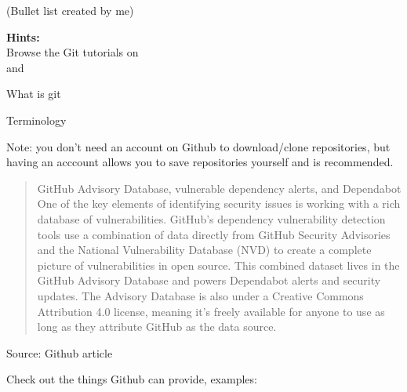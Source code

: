 \documentclass[Screen16to9,17pt]{foils}
\begin{document}
(Bullet list created by me)


{\bf Hints:}\\
Browse the Git tutorials on \\
and 

\begin{list2}
\item What is git
\item Terminology
\end{list2}

Note: you don't need an account on Github to download/clone repositories, but having an acccount allows you to save repositories yourself and is recommended.



\begin{quote}\small
GitHub Advisory Database, vulnerable dependency alerts, and Dependabot
One of the key elements of identifying security issues is working with a rich database of vulnerabilities. GitHub’s dependency vulnerability detection tools use a combination of data directly from GitHub Security Advisories and the National Vulnerability Database (NVD) to create a complete picture of vulnerabilities in open source. This combined dataset lives in the GitHub Advisory Database and powers Dependabot alerts and security updates. The Advisory Database is also under a Creative Commons Attribution 4.0 license, meaning it’s freely available for anyone to use as long as they attribute GitHub as the data source.
\end{quote}
Source: Github article

Check out the things Github can provide, examples:
\begin{list2}
\item {}
\item {}
\item {}
\item {}
\end{list2}
\end{document}
